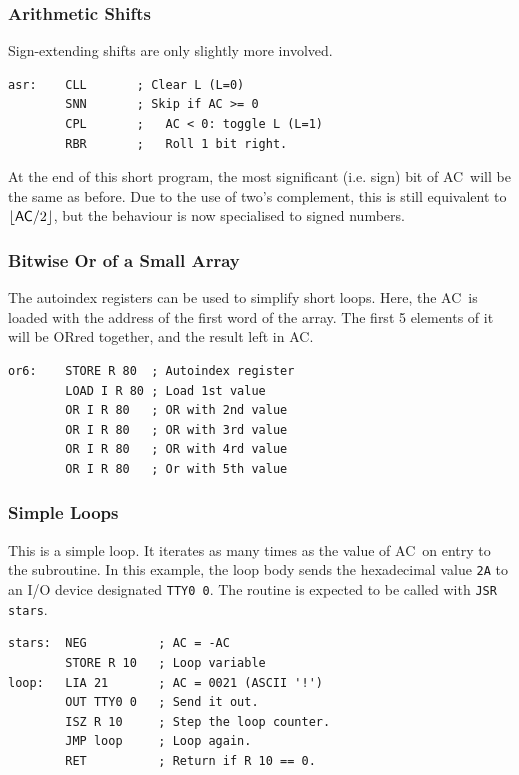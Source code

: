\documentclass[11pt,a4paper,twocolumns]{article}
\newcommand\register[1]{\textsf{#1}}
\newcommand\A{\register{AC}}
\begin{document}
\subsubsection{Arithmetic Shifts}

Sign-extending shifts are only slightly more involved.

\begin{verbatim}
asr:    CLL       ; Clear L (L=0)
        SNN       ; Skip if AC >= 0
        CPL       ;   AC < 0: toggle L (L=1)
        RBR       ;   Roll 1 bit right.
\end{verbatim}

At the end of this short program, the most significant (i.e. sign) bit
of \A\ will be the same as before. Due to the use of two's complement,
this is still equivalent to $\lfloor\mbox{\A}/2\rfloor$, but the
behaviour is now specialised to signed numbers.

\subsubsection{Bitwise Or of a Small Array}

The autoindex registers can be used to simplify short loops. Here, the
\A\ is loaded with the address of the first word of the array. The
first 5 elements of it will be ORred together, and the result left in
\A.

\begin{verbatim}
or6:    STORE R 80  ; Autoindex register
        LOAD I R 80 ; Load 1st value
        OR I R 80   ; OR with 2nd value
        OR I R 80   ; OR with 3rd value
        OR I R 80   ; OR with 4rd value
        OR I R 80   ; Or with 5th value
\end{verbatim}

\subsubsection{Simple Loops}

This is a simple loop. It iterates as many times as the value of
\A\ on entry to the subroutine. In this example, the loop body sends
the hexadecimal value {\tt 2A} to an I/O device designated {\tt TTY0
  0}. The routine is expected to be called with {\tt JSR stars}.

\begin{verbatim}
stars:  NEG          ; AC = -AC
        STORE R 10   ; Loop variable
loop:   LIA 21       ; AC = 0021 (ASCII '!')
        OUT TTY0 0   ; Send it out.
        ISZ R 10     ; Step the loop counter.
        JMP loop     ; Loop again.
        RET          ; Return if R 10 == 0.
\end{verbatim}
\end{document}
